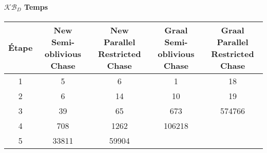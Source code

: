\paragraph{$\mathcal{KB}_D$ Temps}
\begin{center}
\begin{tabular}{|c||c|c|c|c|}
    \hline
    Étape & \shortstack{New \\ Semi-oblivious Chase} & \shortstack{New \\ Parallel Restricted Chase} & \shortstack{Graal \\ Semi-oblivious Chase} & \shortstack{Graal \\ Parallel Restricted Chase} \\
    \hline
     \hline
1&5&	6&					1&	18\\
     \hline
2&6&	14&					10&	19\\
     \hline
3&39&	65&					673&	574766\\
     \hline
4&708&	1262&					106218 &	\\
     \hline
5&33811&	59904&			&			\\
     \hline
\end{tabular}
\end{center}


